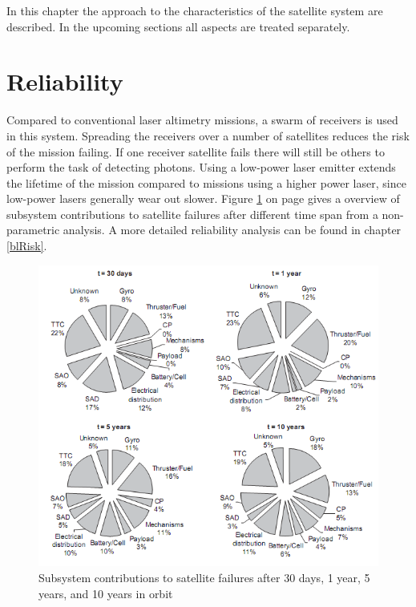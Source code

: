 
In this chapter the approach to the  characteristics of the satellite system are described. In the upcoming sections all aspects are treated separately. 

\section{Reliability}
\label{blRAMSrel}
Compared to conventional laser altimetry missions, a swarm of receivers is used in this system. Spreading the receivers over a number of satellites reduces the risk of the mission failing. If one receiver satellite fails there will still be others to perform the task of detecting photons. Using a low-power laser emitter extends the lifetime of the mission compared to missions using a higher power laser, since low-power lasers generally wear out slower. Figure \ref{R} on page \pageref{R} gives a overview of subsystem contributions to satellite failures after different time span from a non-parametric analysis. A more detailed reliability analysis can be found in chapter \ref{blRisk}.
\begin{figure} [H]
	\begin{center}
         \includegraphics[scale=1]{chapters/img/subsystem_reliability_analysis.png}
	
	\caption{Subsystem contributions to satellite failures after 30 days, 1 year, 5 years, and 10 years in orbit \cite{reliability}}
	\label{R}
	\end{center}
	\end{figure}

